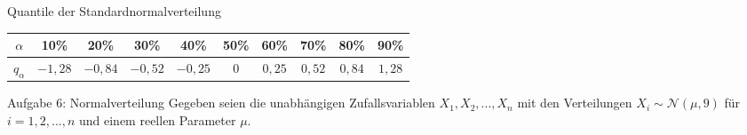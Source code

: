 \documentclass[10pt, a4paper]{exam}
\begin{document}
\begin{questions}
\begin{parts}
\begin{solution}
            Quantile der Standardnormalverteilung

            \begin{center}
                \begin{tabular}{c | c | c | c | c | c | c | c | c | c}
                    $\alpha$     & 10\%    & 20\%    & 30\%    & 40\%    & 50\% & 60\%   & 70\%   & 80\%   & 90\%   \\\hline
                    $q_{\alpha}$ & $-1,28$ & $-0,84$ & $-0,52$ & $-0,25$ & $0$  & $0,25$ & $0,52$ & $0,84$ & $1,28$
                \end{tabular}
            \end{center}
        \end{solution}
    \end{parts}

    \question Aufgabe 6: Normalverteilung
    Gegeben seien die unabhängigen Zufallsvariablen $X_1,X_2,...,X_n$ mit den Verteilungen $X_i \sim \mathcal{N}(\mu,9)$ für $i= 1,2,...,n$ und einem reellen Parameter $\mu$.
\end{questions}
\end{document}
